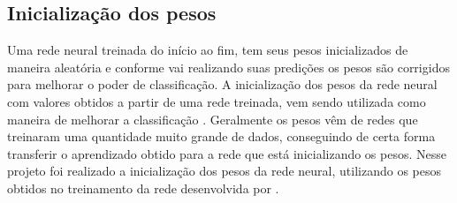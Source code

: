 \subsection{Inicialização dos pesos}
Uma rede neural treinada do início ao fim, tem seus pesos inicializados de maneira aleatória e conforme vai realizando suas predições os pesos são corrigidos para melhorar o poder de classificação. A inicialização dos pesos da rede neural com valores obtidos a partir de uma rede treinada, vem sendo utilizada como maneira de melhorar a classificação \cite{Girshick_2014_CVPR}. Geralmente os pesos vêm de redes que treinaram uma quantidade muito grande de dados, conseguindo de certa forma transferir o aprendizado obtido para a rede que está inicializando os pesos. Nesse projeto foi realizado a inicialização dos pesos da rede neural, utilizando os pesos obtidos no treinamento da rede desenvolvida por .




